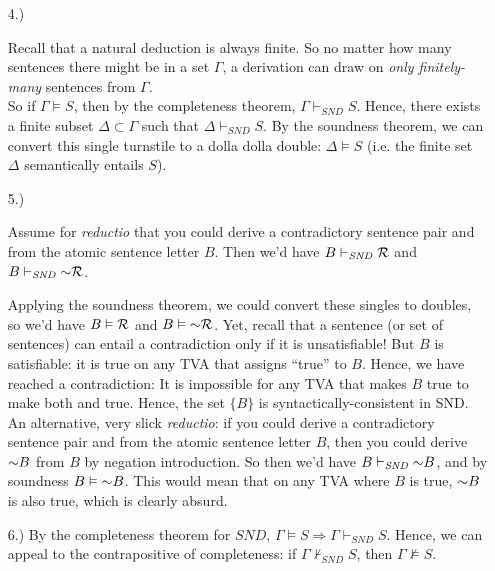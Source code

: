 \documentclass[12pt]{memoir}
\begin{document}
\begin{enumerate}[1.)]
\item[4.)] 

Recall that a natural deduction is always finite. So no matter how many sentences there might be in a set $\Gamma$, a derivation can draw on \textit{only finitely-many} sentences from $\Gamma$. \\ So if $\Gamma \vDash S$, then by the completeness theorem, $\Gamma \vdash_{\mathit{SND}} S$. Hence, there exists a finite subset $\Delta \subset \Gamma$ such that $\Delta \vdash_{\mathit{SND}} S$. By the soundness theorem, we can convert this single turnstile to a dolla dolla double: $\Delta \vDash S$ (i.e. the finite set $\Delta$ semantically entails $S$). 

\newpage

\item[5.)] 

Assume for \textit{reductio} that you could derive a contradictory sentence pair  and \enot{}  from the atomic sentence letter $B$. Then we'd have $B \vdash_{\mathit{SND}} \mathcal{R}$ and $B \vdash_{\mathit{SND}} \enot \metav{R}$. 

Applying the soundness theorem, we could convert these singles to doubles, so we'd have $B \vDash \mathcal{R}$ and $B \vDash \enot \metav{R}$. Yet, recall that a sentence (or set of sentences) can entail a contradiction only if it is unsatisfiable! But $B$ is satisfiable: it is true on any TVA that assigns ``true'' to $B$. Hence, we have reached a contradiction: It is impossible for any TVA that makes $B$ true to make both  and \enot{} true. Hence, the set $\{ B \}$ is syntactically-consistent in SND. \\

An alternative, very slick \textit{reductio}: if you could derive a contradictory sentence pair  and \enot{}  from the atomic sentence letter $B$, then you could derive $\enot B$ from $B$ by negation introduction. So then we'd have $B \vdash_{\mathit{SND}} \enot B$, and by soundness $B \vDash \enot B$. This would mean that on any TVA where $B$ is true, $\enot B$ is also true, which is clearly absurd. \\


\item [6.)]
By the completeness theorem for $\mathit{SND}$, $\Gamma \vDash S \Rightarrow \Gamma \vdash_{\mathit{SND}} S$. Hence, we can appeal to the contrapositive of completeness: if $\Gamma \nvdash_{\mathit{SND}} S$, then $\Gamma \nvDash S$. 


\end{enumerate}
\end{document}
